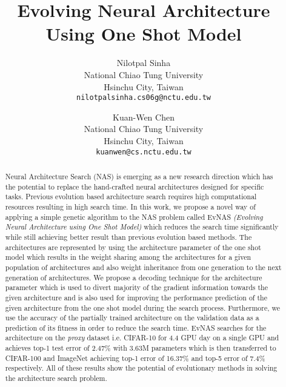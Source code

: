 \documentclass[final]{cvpr}
\begin{document}
\title{Evolving Neural Architecture Using One Shot Model}

\author{Nilotpal Sinha\\
National Chiao Tung University\\
Hsinchu City, Taiwan\\
{\tt\small nilotpalsinha.cs06g@nctu.edu.tw}
\and
Kuan-Wen Chen \\
National Chiao Tung University\\
Hsinchu City, Taiwan\\
{\tt\small kuanwen@cs.nctu.edu.tw}
}

\maketitle


\begin{abstract}
Neural Architecture Search (NAS) is emerging as a new research direction which 
has the potential to replace the hand-crafted neural architectures designed for 
specific tasks. Previous evolution based architecture search requires high computational
resources resulting in high search time. In this work, we propose a novel way of applying a
simple genetic algorithm to the NAS problem called EvNAS \emph{(Evolving Neural Architecture
using One Shot Model)} which reduces the search time significantly while still achieving
better result than previous evolution based methods. The architectures are represented by
using the architecture parameter
of the one shot model which results in the weight sharing among the architectures
for a given population of architectures and also weight inheritance from one
generation to the next generation of architectures. We propose a decoding technique for
the architecture parameter which is used to divert majority of the gradient
information towards the given architecture and is also used for improving the
performance prediction of the given architecture from the one shot model
during the search process. Furthermore, we use the accuracy of the partially trained
architecture on the validation data as a prediction of its fitness in order to reduce the
search time. EvNAS searches for the architecture on the \textit{proxy} dataset i.e. CIFAR-10
for 4.4 GPU day on a single GPU and achieves top-1 test error of 2.47\%
with 3.63M parameters which is then transferred to CIFAR-100 and ImageNet
achieving top-1 error of 16.37\% and top-5 error of 7.4\% respectively. All of
these results show the potential of evolutionary methods in solving the architecture search
problem.
\end{abstract}
\end{document}

